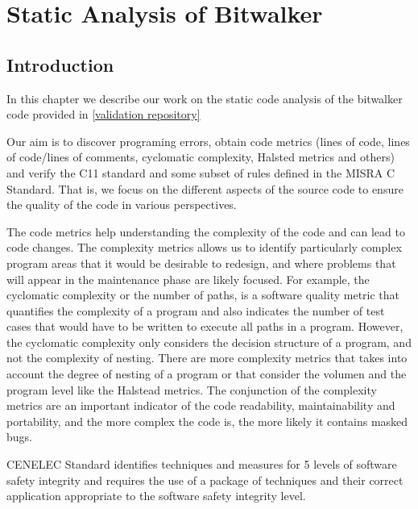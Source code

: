 
\chapter{Static Analysis of Bitwalker}
\label{sec:static-analysis}

\section{Introduction}
In this chapter we describe our work on the static code analysis of the bitwalker code provided in \href{https://github.com/openETCS/validation/tree/master/Artifacts/Subset-026-7_XML/Subset026_7/Bitwalker}{[validation repository]}

Our aim is to discover programing errors, obtain code metrics (lines of code, lines of code/lines of comments, cyclomatic complexity, Halsted metrics and others) and verify the C11 standard and some subset of rules defined in the MISRA C Standard. That is, we focus on the different aspects of the source code to ensure the quality of the code in various perspectives.

The code metrics help understanding the complexity of the code and can lead to code changes. The complexity metrics allows us to identify particularly complex program areas that it would be desirable to redesign, and where problems that will appear in the maintenance phase are likely focused. For example, the cyclomatic complexity or the number of paths, is a software quality metric that quantifies the complexity of a program and also indicates the number of test cases that would have to be written to execute all paths in a program. However, the cyclomatic complexity only considers the decision structure of a program, and not the complexity of nesting. There are more complexity metrics that takes into account the degree of nesting of a program or that consider the volumen and the program level like the Halstead metrics. The conjunction of the complexity metrics are an important indicator of the code readability, maintainability and portability, and the more complex the code is, the more likely it contains masked bugs.

CENELEC Standard identifies techniques and measures for 5 levels of software safety integrity and requires the use of a package of techniques and their correct
application appropriate to the software safety integrity level.

